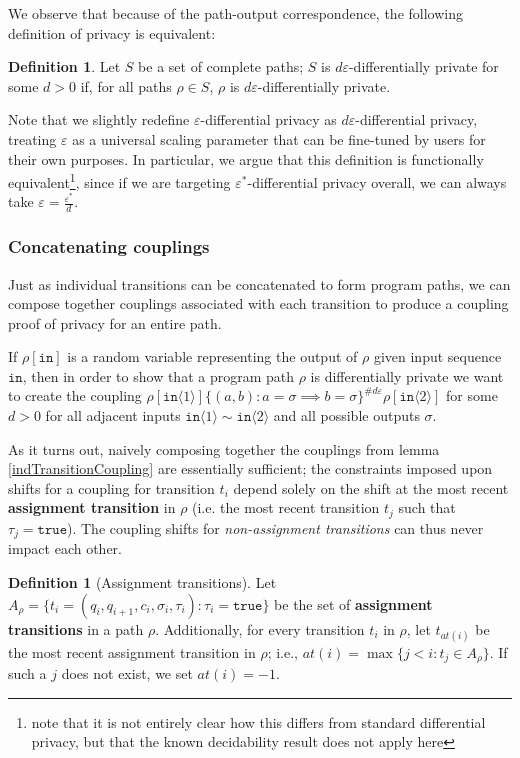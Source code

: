 \documentclass[12pt]{article}
\newcommand{\brangle}[1]{\langle#1 \rangle}
\theoremstyle{definition}
\newtheorem{defn}[thm]{Definition}
\begin{document}
We observe that because of the path-output correspondence, the following definition of privacy is equivalent:
\begin{defn}
    Let $S$ be a set of complete paths; $S$ is $d\varepsilon$-differentially private for some $d>0$ if, for all paths $\rho\in S$, $\rho$ is $d\varepsilon$-differentially private.
\end{defn}

Note that we slightly redefine $\varepsilon$-differential privacy as $d\varepsilon$-differential privacy, treating $\varepsilon$ as a universal scaling parameter that can be fine-tuned by users for their own purposes. 
In particular, we argue that this definition is functionally equivalent\footnote{\cite{chadhaLinearTimeDecidability2021} note that it is not entirely clear how this differs from standard differential privacy, but that the known decidability result does not apply here}, since if we are targeting $\varepsilon^*$-differential privacy overall, we can always take $\varepsilon = \frac{\varepsilon^*}{d}$.

\subsubsection{Concatenating couplings}

Just as individual transitions can be concatenated to form program paths, we can compose together couplings associated with each transition to produce a coupling proof of privacy for an entire path. 

If $\rho[\texttt{in}]$ is a random variable representing the output of $\rho$ given input sequence $\texttt{in}$, then in order to show that a program path $\rho$ is differentially private we want to create the coupling $\rho[\texttt{in}\brangle{1}]\{(a, b): a=\sigma\implies b=\sigma\}^{\#d\varepsilon}\rho[\texttt{in}\brangle{2}]$ for some $d>0$ for all adjacent inputs $\texttt{in}\brangle{1}\sim\texttt{in}\brangle{2}$ and all possible outputs $\sigma$.

As it turns out, naively composing together the couplings from lemma \ref{indTransitionCoupling} are essentially sufficient; the constraints imposed upon shifts for a coupling for transition $t_i$ depend solely on the shift at the most recent \textbf{assignment transition} in $\rho$ (i.e. the most recent transition $t_j$ such that $\tau_j = \texttt{true}$). 
The coupling shifts for \textit{non-assignment transitions} can thus never impact each other. 

\begin{defn}[Assignment transitions]
    Let $A_\rho = \{t_i=(q_i, q_{i+1}, c_i, \sigma_i, \tau_i): \tau_i = \texttt{true}\}$ be the set of \textbf{assignment transitions} in a path $\rho$. Additionally, for every transition $t_i$ in $\rho$, let $t_{at(i)}$ be the most recent assignment transition in $\rho$; i.e., $at(i) = \max\{j<i: t_j\in A_\rho\}$. If such a $j$ does not exist, we set $at(i)=-1$. 
\end{defn}
\end{document}
